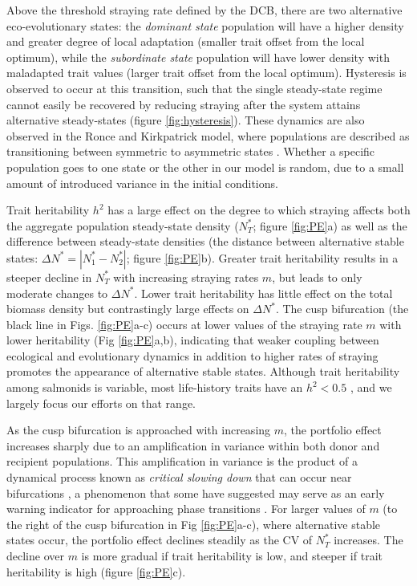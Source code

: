 \documentclass{revtex4}
\begin{document}
Above the threshold straying rate defined by the DCB, there are two alternative eco-evolutionary states: the \emph{dominant state} population will have a higher density and greater degree of local adaptation (smaller trait offset from the local optimum), while the \emph{subordinate state} population will have lower density with maladapted trait values (larger trait offset from the local optimum). 
Hysteresis is observed to occur at this transition, such that the single steady-state regime cannot easily be recovered by reducing straying after the system attains alternative steady-states (figure \ref{fig:hysteresis}).
These dynamics are also observed in the Ronce and Kirkpatrick model, where populations are described as transitioning between symmetric to asymmetric states \citep{Ronce:2001dp}.
Whether a specific population goes to one state or the other in our model is random, due to a small amount of introduced variance in the initial conditions.






Trait heritability $h^2$ has a large effect on the degree to which straying affects both the aggregate population steady-state density ($N^*_T$; figure \ref{fig:PE}a) as well as the difference between steady-state densities (the distance between alternative stable states: $\Delta N^*=|N^*_1-N^*_2|$; figure \ref{fig:PE}b).
Greater trait heritability results in a steeper decline in $N_T^*$ with increasing straying rates $m$, but leads to only moderate changes to $\Delta N^*$.
Lower trait heritability has little effect on the total biomass density but contrastingly large effects on $\Delta N^*$.
The cusp bifurcation (the black line in Figs. \ref{fig:PE}a-c) occurs at lower values of the straying rate $m$ with lower heritability (Fig \ref{fig:PE}a,b), indicating that weaker coupling between ecological and evolutionary dynamics in addition to higher rates of straying promotes the appearance of alternative stable states.
Although trait heritability among salmonids is variable, most life-history traits have an $h^2 <0.5$ \citep{Carlson:2008hl}, and we largely focus our efforts on that range.

As the cusp bifurcation is approached with increasing $m$, the portfolio effect increases sharply due to an amplification in variance within both donor and recipient populations.
This amplification in variance is the product of a dynamical process known as \emph{critical slowing down} that can occur near bifurcations \citep{Scheffer:2009gg}, a phenomenon that some have suggested may serve as an early warning indicator for approaching phase transitions \citep{Scheffer:2009gg,Lade:2012eu,Anonymous:2013br,Dakos:2014br,Krkosek:2014ch}.
For larger values of $m$ (to the right of the cusp bifurcation in Fig \ref{fig:PE}a-c), where alternative stable states occur, the portfolio effect declines steadily as the CV of $N_T^*$ increases.
The decline over $m$ is more gradual if trait heritability is low, and steeper if trait heritability is high (figure \ref{fig:PE}c).
\end{document}
